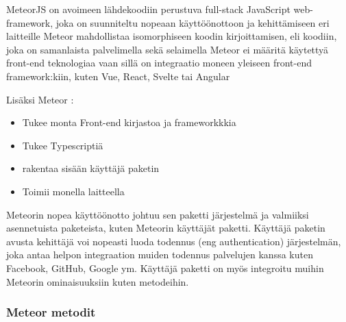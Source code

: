 









MeteorJS on avoimeen lähdekoodiin perustuva full-stack JavaScript web-framework, joka on 
suunniteltu nopeaan käyttöönottoon ja kehittämiseen eri laitteille
Meteor mahdollistaa isomorphiseen koodin kirjoittamisen, eli koodiin, joka on samanlaista palvelimella sekä selaimella %
Meteor ei määritä käytettyä front-end teknologiaa vaan sillä on integraatio moneen yleiseen front-end framework:kiin, kuten Vue, React, Svelte tai Angular
\medskip



    

Lisäksi Meteor :
\begin{itemize}
    \item Tukee monta Front-end kirjastoa ja frameworkkkia
    \item Tukee Typescriptiä
    \item rakentaa sisään käyttäjä paketin
    \item Toimii monella laitteella
\end{itemize}
\medskip


Meteorin nopea käyttöönotto johtuu sen paketti järjestelmä ja valmiiksi asennetuista paketeista, kuten Meteorin käyttäjät paketti. 
Käyttäjä paketin avusta kehittäjä voi nopeasti luoda todennus (eng authentication) järjestelmän,
joka antaa helpon integraation muiden todennus palvelujen kanssa kuten Facebook, GitHub, Google ym.
Käyttäjä paketti on myös integroitu muihin Meteorin ominaisuuksiin kuten metodeihin.



\subsubsection{Meteor metodit}

